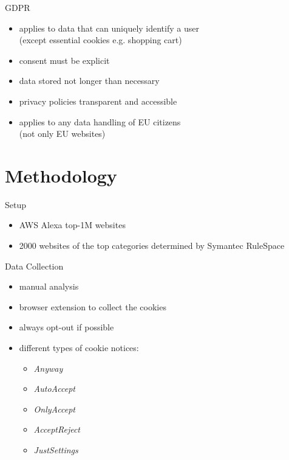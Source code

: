 \documentclass[xcolor={dvipsnames}]{beamer}
\begin{document}
\begin{frame}{GDPR}
    \begin{itemize}
        \item applies to data that can uniquely identify a user\\(except essential cookies e.g. shopping cart)
        \item consent must be explicit
        \item data stored not longer than necessary
        \item privacy policies transparent and accessible
        \item applies to any data handling of EU citizens\\(not only EU websites)
    \end{itemize}
\end{frame}

\section{Methodology}

\begin{frame}{Setup}
	\begin{itemize}
		\item AWS Alexa top-1M websites
		\item 2000 websites of the top categories determined by Symantec RuleSpace
	\end{itemize}
\end{frame}

\begin{frame}{Data Collection}
    \begin{itemize}
        \item manual analysis
        \item browser extension to collect the cookies
        \item always opt-out if possible
        \item different types of cookie notices:
            \begin{itemize}
                \item \emph{Anyway}
                \item \emph{AutoAccept}
                \item \emph{OnlyAccept}
                \item \emph{AcceptReject}
                \item \emph{JustSettings}
            \end{itemize}
    \end{itemize}
\end{frame}
\end{document}
